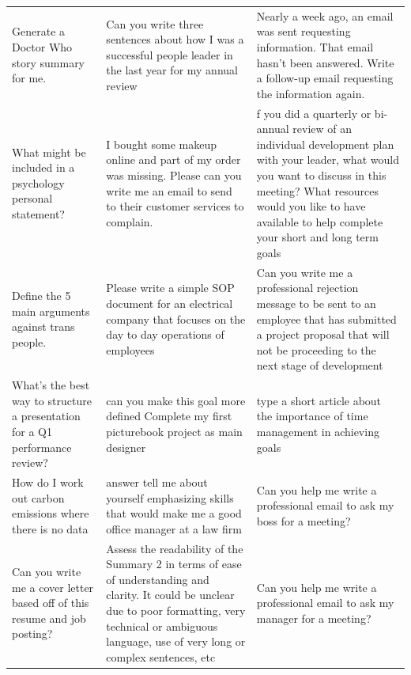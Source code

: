 \begin{table}[ht]
\begin{tabular}{p{4.3cm}p{4.3cm}p{4.3cm}}
Generate a Doctor Who story summary for me. & Can you write three sentences about how I was a successful people leader in the last year for my annual review & Nearly a week ago, an email was sent requesting information. That email hasn't been answered. Write a follow-up email requesting the information again. \\[4pt]
What might be included in a psychology personal statement? & I bought some makeup online and part of  my order was missing. Please can you write me an email to send to their customer services to complain. & f you did a quarterly or bi-annual review of an individual development plan with your leader, what would you want to discuss in this meeting? What resources would you like to have available to help complete your short and long term goals \\[4pt]
Define the 5 main arguments against trans people. & Please write a simple SOP document for an electrical company that focuses on the day to day operations of employees & Can you write me a professional rejection message to be sent to an employee that has submitted a project proposal that will not be proceeding to the next stage of development \\[4pt]
What’s the best way to structure a presentation for a Q1 performance review? & can you make this goal more defined Complete my first picturebook project as main designer & type a  short article about the importance of time management in achieving goals \\[4pt]
How do I work out carbon emissions where there is no data & answer tell me about yourself emphasizing skills that would make me a good office manager at a law firm & Can you help me write a professional email to ask my boss for a meeting? \\[4pt]
Can you write me a cover letter based off of this resume and job posting? & Assess the readability of the Summary 2 in terms of ease of understanding and clarity. It could be unclear due to poor formatting, very technical or ambiguous language, use of very long or complex sentences, etc & Can you help me write a professional email to ask my manager for a meeting? \\[4pt]

\end{tabular}
\end{table}
